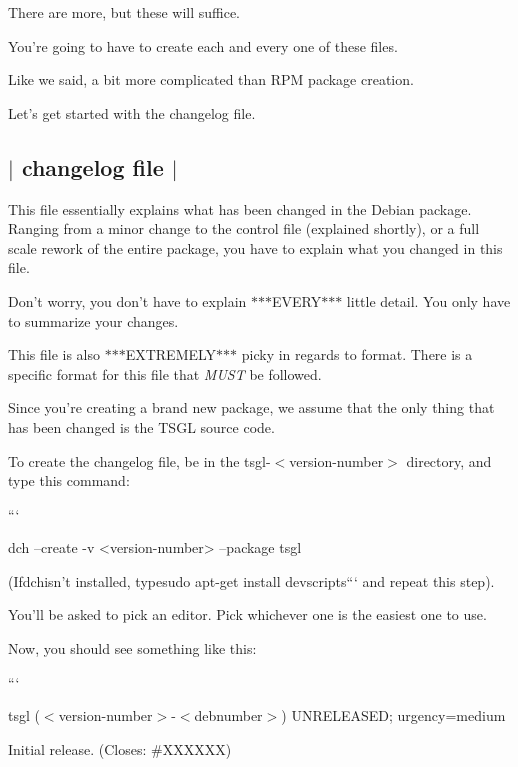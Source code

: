 There are more, but these will suffice.

You're going to have to create each and every one of these files.

Like we said, a bit more complicated than R\-P\-M package creation.

Let's get started with the {\ttfamily changelog} file. 

 \subsection*{$\vert$ {\ttfamily changelog} file $\vert$ }

This file essentially explains what has been changed in the Debian package. Ranging from a minor change to the {\ttfamily control} file (explained shortly), or a full scale rework of the entire package, you have to explain what you changed in this file.

Don't worry, you don't have to explain $\ast$$\ast$$\ast$\-E\-V\-E\-R\-Y$\ast$$\ast$$\ast$ little detail. You only have to summarize your changes.

This file is also $\ast$$\ast$$\ast$\-E\-X\-T\-R\-E\-M\-E\-L\-Y$\ast$$\ast$$\ast$ picky in regards to format. There is a specific format for this file that {\itshape M\-U\-S\-T} be followed.

Since you're creating a brand new package, we assume that the only thing that has been changed is the T\-S\-G\-L source code.

To create the {\ttfamily changelog} file, be in the {\ttfamily tsgl-\/$<$version-\/number$>$} directory, and type this command\-:

``` \begin{DoxyVerb}dch --create -v <version-number> --package tsgl
\end{DoxyVerb}


{\ttfamily  (If}dch{\ttfamily isn't installed, type}sudo apt-\/get install devscripts``` and repeat this step).

You'll be asked to pick an editor. Pick whichever one is the easiest one to use.

Now, you should see something like this\-:

```

tsgl ($<$version-\/number$>$-\/$<$debnumber$>$) U\-N\-R\-E\-L\-E\-A\-S\-E\-D; urgency=medium


\begin{DoxyItemize}
\item Initial release. (Closes\-: \#\-X\-X\-X\-X\-X\-X)
\end{DoxyItemize}

